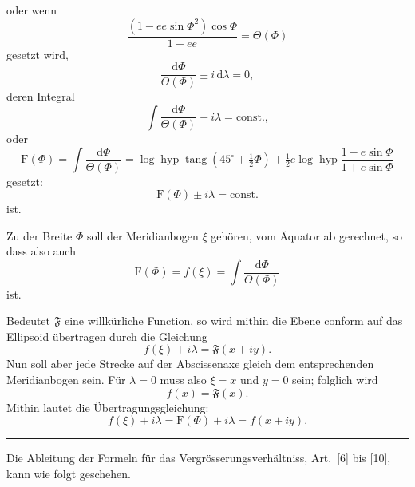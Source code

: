 {\small
\noindent oder wenn
\begin{equation*}
\frac{(1-ee\sin\Phi^2)\cos\Phi}{1-ee}=\Theta(\Phi)
\tag*{1)}
\end{equation*}
\noindent gesetzt wird,
\[
\frac{\mathrm d\Phi}{\Theta(\Phi)}\pm i\,\mathrm d\lambda=0,
\]
\noindent deren Integral
\[
\int\frac{\mathrm d\Phi}{\Theta(\Phi)}\pm i\lambda=\mathrm{const.},
\]
\noindent oder
\begin{equation*}
\mathrm F(\Phi)=\int\frac{\mathrm d\Phi}{\Theta(\Phi)}
=\log\operatorname{hyp}\operatorname{tang}(45^\circ+\tfrac12\Phi)
+\tfrac12 e\log\operatorname{hyp}\frac{1-e\sin\Phi}{1+e\sin\Phi}
\tag*{2)}
\end{equation*}
\noindent gesetzt:
\[
\mathrm F(\Phi)\pm i\lambda=\mathrm{const.}
\]
\noindent ist.

Zu der Breite \(\Phi\) soll der Meridianbogen \(\xi\) gehören, vom Äquator ab gerechnet,
so dass also auch
\begin{equation*}
\mathrm F(\Phi)=f(\xi)=\int\frac{\mathrm d\Phi}{\Theta(\Phi)}
\tag*{3)}
\end{equation*}
\noindent ist.

Bedeutet \(\mathfrak F\) eine willkürliche Function, so wird mithin die Ebene conform
auf das Ellipsoid übertragen durch die Gleichung
\[
f(\xi)+i\lambda=\mathfrak F(x+iy).
\]
Nun soll aber jede Strecke auf der Abscissenaxe gleich dem entsprechenden Meridianbogen
sein. Für \(\lambda=0\) muss also \(\xi=x\) und \(y=0\) sein; folglich wird
\[
f(x)=\mathfrak F(x).
\]
\noindent Mithin lautet die Übertragungsgleichung:
\begin{equation*}
f(\xi)+i\lambda=\mathrm F(\Phi)+i\lambda=f(x+iy).
\tag*{4)}
\end{equation*}
\begin{center}\rule{.24\linewidth}{.4pt}\end{center}

Die Ableitung der Formeln für das Vergrösserungsverhältniss, Art.\ [6] bis [10],
kann wie folgt geschehen.

}
